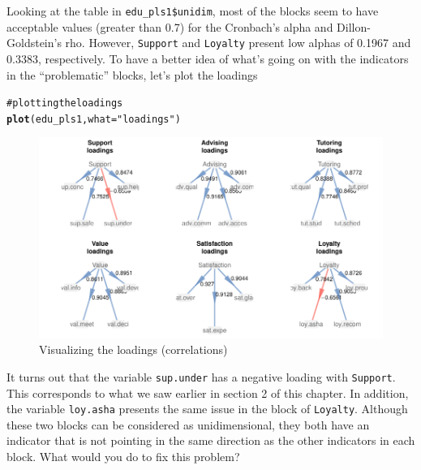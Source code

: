 \documentclass[12pt]{book}\usepackage{graphicx, color}
\makeatletter
\newcommand{\hlfunctioncall}[1]{\textcolor[rgb]{0.501960784313725,0,0.329411764705882}{\textbf{#1}}}%
\newcommand{\hlstring}[1]{\textcolor[rgb]{0.6,0.6,1}{#1}}%
\newcommand{\hlcomment}[1]{\textcolor[rgb]{0.180392156862745,0.6,0.341176470588235}{#1}}%
\newenvironment{kframe}{%
 \def\at@end@of@kframe{}%
 \ifinner\ifhmode%
  \def\at@end@of@kframe{\end{minipage}}%
  \begin{minipage}{\columnwidth}%
 \fi\fi%
 \def\FrameCommand##1{\hskip\@totalleftmargin \hskip-\fboxsep
 \colorbox{shadecolor}{##1}\hskip-\fboxsep
     \hskip-\linewidth \hskip-\@totalleftmargin \hskip\columnwidth}%
 \MakeFramed {\advance\hsize-\width
   \@totalleftmargin\z@ \linewidth\hsize
   \@setminipage}}%
 {\par\unskip\endMakeFramed%
 \at@end@of@kframe}
\newenvironment{knitrout}{}{} %
\newcommand{\code}[1]{\texttt{#1}}
\makeatother
\begin{document}
Looking at the table in \code{edu\_pls1\$unidim}, most of the blocks seem to have acceptable values (greater than 0.7) for the Cronbach's alpha and Dillon-Goldstein's rho. However, \code{Support} and \code{Loyalty} present low alphas of 0.1967 and 0.3383, respectively. To have a better idea of what's going on with the indicators in the ``problematic'' blocks, let's plot the loadings
\begin{knitrout}
\color{fgcolor}\begin{kframe}
\begin{alltt}
\hlcomment{# plotting the loadings}
\hlfunctioncall{plot}(edu_pls1, what = \hlstring{"loadings"})
\end{alltt}
\end{kframe}\begin{figure}[h]


{\centering \includegraphics[width=1\linewidth,height=.6\linewidth]{figure/edu_pls1_loadings_plot} 

}

\caption[Visualizing the loadings (correlations)]{Visualizing the loadings (correlations)\label{fig:edu_pls1_loadings_plot}}
\end{figure}


\end{knitrout}


It turns out that the variable \code{sup.under} has a negative loading with \code{Support}. This corresponds to what we saw earlier in section 2 of this chapter. In addition, the variable \code{loy.asha} presents the same issue in the block of \code{Loyalty}. Although these two blocks can be considered as unidimensional, they both have an indicator that is not pointing in the same direction as the other indicators in each block. What would you do to fix this problem?
\end{document}

